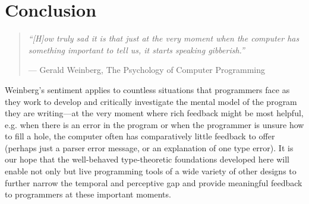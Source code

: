 \newcommand{\discussionSection}{Conclusion}
\section{\protect\discussionSection} %
\label{sec:discussion}

\begin{comment}
To conclude, we quote Weinberg from The Psychology of Computer Programming (1998): ``how truly sad it is that just at the very moment
when the computer has something important to tell us, it starts
speaking gibberish.''
\end{comment}
\vspace{3pt}
\begin{quote}
\textit{``[H]ow truly sad it is that just at the very moment
when the computer has something important to tell us, it starts
speaking gibberish.''}

\vspace{3pt}

\hfill{}--- Gerald Weinberg, The Psychology of Computer Programming \cite{weinberg1971psychology}
\end{quote}
\vspace{3pt}

\noindent
%
Weinberg's sentiment applies to countless situations that programmers face as they work to develop and critically investigate the mental model of the program they are writing---at the very moment where rich feedback might be most helpful, e.g. when there is an error in the program or when the programmer is unsure how to fill a hole, the computer often has comparatively little feedback to offer (perhaps just a parser error message, or an explanation of one type error). 
%
%
%
It is our hope that the well-behaved  type-theoretic foundations developed here will enable not only \Hazel but live programming tools of a wide variety of other designs to further narrow the temporal and perceptive gap and provide meaningful feedback to programmers at these important   moments. 


